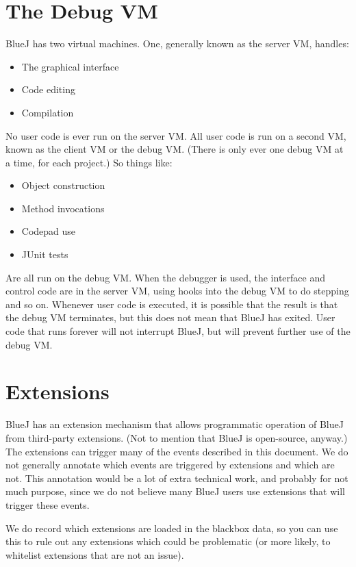 \documentclass{report}
\begin{document}
\section{The Debug VM}

BlueJ has two virtual machines.  One, generally known as the server VM,
handles:

\begin{itemize}
\item The graphical interface
\item Code editing
\item Compilation
\end{itemize}

No user code is ever run on the server VM.  All user code is run on a second
VM, known as the client VM or the debug VM.  (There is only ever one debug VM
at a time, for each project.)  So things like:

\begin{itemize}
\item Object construction
\item Method invocations
\item Codepad use
\item JUnit tests
\end{itemize}

Are all run on the debug VM.  When the debugger is used, the interface and
control code are in the server VM, using hooks into the debug VM to do
stepping and so on.  Whenever user code is executed, it is possible that the
result is that the debug VM terminates, but this does not mean that BlueJ has
exited.  User code that runs forever will not interrupt BlueJ, but will
prevent further use of the debug VM.


\section{Extensions}

BlueJ has an extension mechanism that allows programmatic operation of BlueJ
from third-party extensions.  (Not to mention that BlueJ is open-source,
anyway.)  The extensions can trigger many of the events described in this
document.  We do not generally annotate which events are triggered by extensions and
which are not.  This annotation would be a lot of extra technical work, and
probably for not much purpose, since we do not believe many BlueJ users use
extensions that will trigger these events.

We do record which extensions are loaded in the blackbox data, so you can use
this to rule out any extensions which could be problematic (or more likely, to
whitelist extensions that are not an issue).
\end{document}
